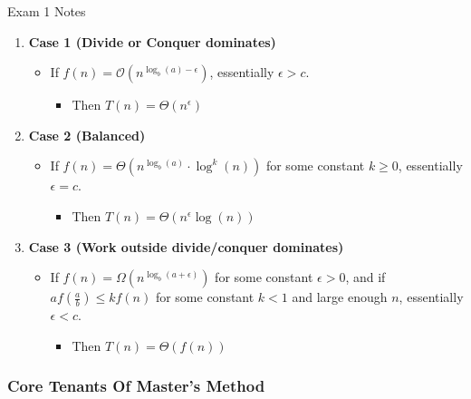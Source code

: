 \begin{examnotes}{Exam 1 Notes}
\begin{highlight}
        \begin{enumerate}
            \item \textbf{Case 1 (Divide or Conquer dominates)}
            \begin{itemize}
                \item If $f(n) = \mathcal{O}(n^{\log_{b}{(a)} - \epsilon})$, essentially $\epsilon > c$.
                \begin{itemize}
                    \item Then $T(n) = \Theta(n^{\epsilon})$
                \end{itemize}
            \end{itemize}
            \item \textbf{Case 2 (Balanced)}
            \begin{itemize}
                \item If $f(n) = \Theta(n^{\log_{b}{(a)}} \cdot \log^{k}{(n)})$ for some constant $k \geq 0$, essentially $\epsilon = c$.
                \begin{itemize}
                    \item Then $T(n) = \Theta(n^{\epsilon}\log{(n)})$
                \end{itemize}
            \end{itemize}
            \item \textbf{Case 3 (Work outside divide/conquer dominates)}
            \begin{itemize}
                \item If $f(n) = \Omega(n^{\log_{b}{(a + \epsilon)}})$ for some constant $\epsilon > 0$, and if $af\left(\frac{a}{b}\right) \leq k f(n)$ for some constant $k < 1$ and large enough $n$,
                essentially $\epsilon < c$.
                \begin{itemize}
                    \item Then $T(n) = \Theta(f(n))$
                \end{itemize}
            \end{itemize}
        \end{enumerate}
    \end{highlight}

    \subsubsection*{Core Tenants Of Master's Method}


\end{examnotes}
